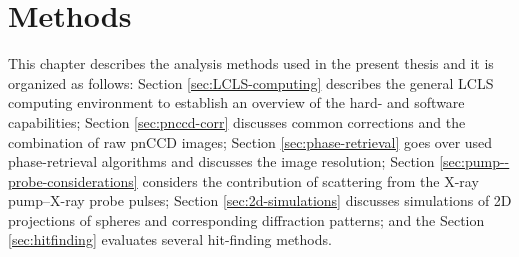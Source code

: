 \chapter{Methods}\label{ch:methods}
This chapter describes the analysis methods used in the present thesis and it is organized as follows: Section \ref{sec:LCLS-computing} describes the general LCLS computing environment to establish an overview of the hard- and software capabilities; Section \ref{sec:pnccd-corr} discusses common corrections and the combination of raw pnCCD images;  Section \ref{sec:phase-retrieval} goes over used phase-retrieval algorithms and discusses the image resolution; Section \ref{sec:pump--probe-considerations} considers the contribution of scattering from the X-ray pump--X-ray probe pulses; Section \ref{sec:2d-simulations} discusses simulations of 2D projections of spheres and corresponding diffraction patterns; and the Section \ref{sec:hitfinding} evaluates several hit-finding methods.
%
%
%
